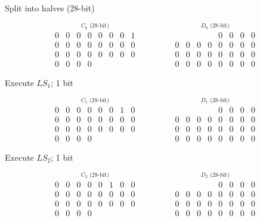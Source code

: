 \documentclass[12pt]{article}
\begin{document}
\begin{enumerate}
\begin{enumerate}
			Split into halves (28-bit)
			
			\[
			\stackrel{\mbox{$C_0$ (28-bit)}}{
				\begin{matrix}
					0&0&0&0&0&0&0&1\\ 
					0&0&0&0&0&0&0&0\\
					0&0&0&0&0&0&0&0\\
					0&0&0&0
				\end{matrix}}\quad\quad\quad\quad
			\stackrel{\mbox{$D_0$ (28-bit)}}{
				\begin{matrix}
					{}&{}&{}&{}&0&0&0&0\\ 
					0&0&0&0&0&0&0&0\\
					0&0&0&0&0&0&0&0\\
					0&0&0&0&0&0&0&0
				\end{matrix}}
			\]
			
			Execute $LS_1$; 1 bit
			
			\[
			\stackrel{\mbox{$C_1$ (28-bit)}}{
				\begin{matrix}
					0&0&0&0&0&0&1&0\\ 
					0&0&0&0&0&0&0&0\\
					0&0&0&0&0&0&0&0\\
					0&0&0&0
				\end{matrix}}\quad\quad\quad\quad
			\stackrel{\mbox{$D_1$ (28-bit)}}{
				\begin{matrix}
					{}&{}&{}&{}&0&0&0&0\\ 
					0&0&0&0&0&0&0&0\\
					0&0&0&0&0&0&0&0\\
					0&0&0&0&0&0&0&0
				\end{matrix}}
			\]
			
			Execute $LS_2$; 1 bit
			
			\[
			\stackrel{\mbox{$C_2$ (28-bit)}}{
				\begin{matrix}
					0&0&0&0&0&1&0&0\\ 
					0&0&0&0&0&0&0&0\\
					0&0&0&0&0&0&0&0\\
					0&0&0&0
				\end{matrix}}\quad\quad\quad\quad
			\stackrel{\mbox{$D_2$ (28-bit)}}{
				\begin{matrix}
					{}&{}&{}&{}&0&0&0&0\\ 
					0&0&0&0&0&0&0&0\\
					0&0&0&0&0&0&0&0\\
					0&0&0&0&0&0&0&0
				\end{matrix}}
			\]
			

\end{enumerate}
\end{enumerate}
\end{document}
